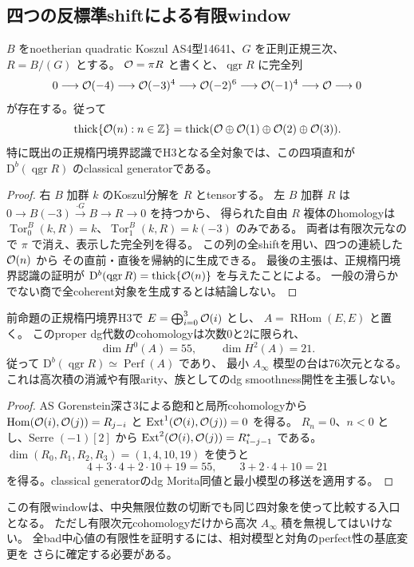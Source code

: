 \subsection{四つの反標準shiftによる有限window}
\label{subsec:cubic-four-window}
\begin{proposition}
\label{prop:cubic-four-window}
$B$ をnoetherian quadratic Koszul AS4型14641、$G$ を正則正規三次、$R=B/(G)$ とする。
$\mathcal O=\pi R$ と書くと、$\operatorname{qgr}R$ に完全列
\[
 0\longrightarrow\mathcal O(-4)\longrightarrow\mathcal O(-3)^4\longrightarrow
 \mathcal O(-2)^6\longrightarrow\mathcal O(-1)^4\longrightarrow\mathcal O\longrightarrow0
\]
が存在する。従って
\[
 \operatorname{thick}\{\mathcal O(n):n\in\mathbb Z\}
 =\operatorname{thick}(\mathcal O\oplus\mathcal O(1)\oplus\mathcal O(2)\oplus\mathcal O(3)).
\]
特に既出の正規楕円境界認識でH3となる全対象では、この四項直和が
$\mathrm D^b(\operatorname{qgr}R)$ のclassical generatorである。
\end{proposition}
\begin{proof}
右 $B$ 加群 $k$ のKoszul分解を $R$ とtensorする。
左 $B$ 加群 $R$ は $0\to B(-3)\xrightarrow{\cdot G}B\to R\to0$ を持つから、
得られた自由 $R$ 複体のhomologyは
$\operatorname{Tor}_0^B(k,R)=k$、$\operatorname{Tor}_1^B(k,R)=k(-3)$ のみである。
両者は有限次元なので $\pi$ で消え、表示した完全列を得る。
この列の全shiftを用い、四つの連続した $\mathcal O(n)$ から
その直前・直後を帰納的に生成できる。
最後の主張は、正規楕円境界認識の証明が
$\mathrm D^b(\operatorname{qgr}R)=\operatorname{thick}\{\mathcal O(n)\}$ を与えたことによる。
一般の滑らかでない商で全coherent対象を生成するとは結論しない。
\end{proof}

\begin{corollary}
\label{cor:cubic-76-end-model}
前命題の正規楕円境界H3で $E=\bigoplus_{i=0}^3\mathcal O(i)$ とし、
$A=\operatorname{RHom}(E,E)$ と置く。
このproper dg代数のcohomologyは次数0と2に限られ、
\[
 \dim H^0(A)=55,\qquad \dim H^2(A)=21.
\]
従って $\mathrm D^b(\operatorname{qgr}R)\simeq\operatorname{Perf}(A)$ であり、
最小 $A_\infty$ 模型の台は76次元となる。
これは高次積の消滅や有限arity、族としてのdg smoothness開性を主張しない。
\end{corollary}
\begin{proof}
AS Gorenstein深さ3による飽和と局所cohomologyから
$\operatorname{Hom}(\mathcal O(i),\mathcal O(j))=R_{j-i}$ と
$\operatorname{Ext}^1(\mathcal O(i),\mathcal O(j))=0$ を得る。
$R_n=0$、$n<0$ とし、Serre $(-1)[2]$ から
$\operatorname{Ext}^2(\mathcal O(i),\mathcal O(j))=R_{i-j-1}^*$ である。
$\dim(R_0,R_1,R_2,R_3)=(1,4,10,19)$ を使うと
\[
 4+3\cdot4+2\cdot10+19=55,\qquad
 3+2\cdot4+10=21
\]
を得る。classical generatorのdg Morita同値と最小模型の移送を適用する。
\end{proof}

この有限windowは、中央無限位数の切断でも同じ四対象を使って比較する入口となる。
ただし有限次元cohomologyだけから高次 $A_\infty$ 積を無視してはいけない。
全bad中心値の有限性を証明するには、相対模型と対角のperfect性の基底変更を
さらに確定する必要がある。
